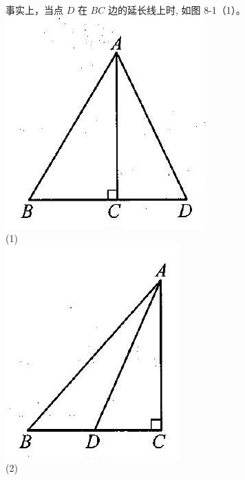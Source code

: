 \documentclass[10pt]{article}
\begin{document}
事实上，当点 $D$ 在 $B C$ 边的延长线上时, 如图 8-1（1）。\\
\includegraphics[max width=\textwidth, center]{2024_10_30_2c8f45efd4a519b08e1ag-080(1)}\\
(1)\\
\includegraphics[max width=\textwidth, center]{2024_10_30_2c8f45efd4a519b08e1ag-080}\\
(2)
\end{document}
